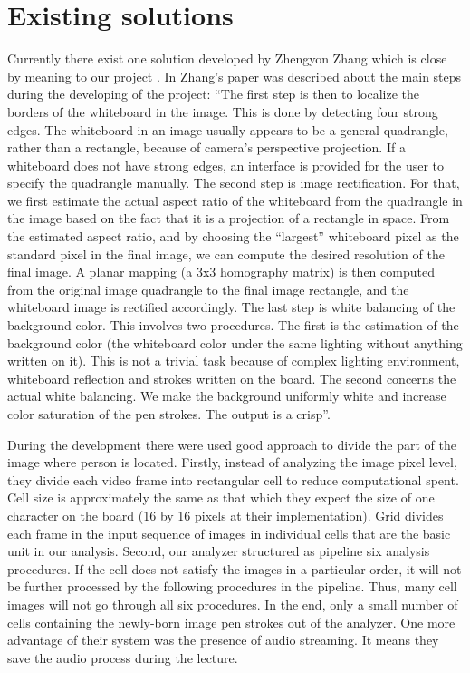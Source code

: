 \section{Existing solutions}
Currently there exist one solution developed by Zhengyon Zhang which is close by meaning to our project \cite{Zhengyou}. In Zhang’s paper was described about the main steps during the developing of the project: “The first step is then to localize the borders of the whiteboard in the image. This is done by detecting four strong edges. The whiteboard in an image usually appears to be a general quadrangle, rather than a rectangle, because of camera’s perspective projection. If a whiteboard does not have strong edges, an interface is provided for the user to specify the quadrangle manually. The second step is image rectification. For that, we first estimate the actual aspect ratio of the whiteboard from the quadrangle in the image based on the fact that it is a projection of a rectangle in space. From the estimated aspect ratio, and by choosing the “largest” whiteboard pixel as the standard pixel in the final image, we can compute the desired resolution of the final image. A planar mapping (a 3x3 homography matrix) is then computed from the original image quadrangle to the final image rectangle, and the whiteboard image is rectified accordingly. The last step is white balancing of the background color. This involves two procedures. The first is the estimation of the background color (the whiteboard color under the same lighting without anything written on it). This is not a trivial task because of complex lighting environment, whiteboard reflection and strokes written on the board. The second concerns the actual white balancing. We make the background uniformly white and increase color saturation of the pen strokes. The output is a crisp”\cite{Zhengyou}. 

During the development there were used good approach to divide the part of the image where person is located. Firstly, instead of analyzing the image pixel level, they divide each video frame into rectangular cell to reduce computational spent. Cell size is approximately the same as that which they expect the size of one character on the board (16 by 16 pixels at their implementation). Grid divides each frame in the input sequence of images in individual cells that are the basic unit in our analysis. Second, our analyzer structured as pipeline six analysis procedures. If the cell does not satisfy the images in a particular order, it will not be further processed by the following procedures in the pipeline. Thus, many cell images will not go through all six procedures. In the end, only a small number of cells containing the newly-born image pen strokes out of the analyzer.
One more advantage of their system was the presence of audio streaming. It means they save the audio process during the lecture.

